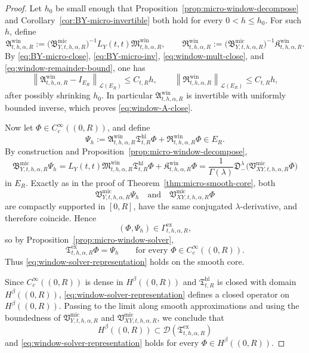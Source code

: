 \documentclass[11pt,a4paper]{amsart}
\theoremstyle{plain}
\theoremstyle{definition}
\theoremstyle{remark}
\begin{document}
\begin{proof}
Let \(h_0\) be small enough that Proposition~\ref{prop:micro-window-decompose} and
Corollary~\ref{cor:BY-micro-invertible} both hold for every \(0<h\le h_0\). For such \(h\), define
\[
\mathfrak A_{t,h,\alpha,R}^{\mathrm{win}}
:=
\bigl(
\mathfrak B_{Y,t,h,\alpha,R}^{\mathrm{mic}}
\bigr)^{-1}
L_Y(t,t)\mathfrak M_{t,h,\alpha,R}^{\mathrm{win}},
\qquad
\mathfrak R_{t,h,\alpha,R}^{\mathrm{win}}
:=
\bigl(
\mathfrak B_{Y,t,h,\alpha,R}^{\mathrm{mic}}
\bigr)^{-1}
\mathfrak K_{t,h,\alpha,R}^{\mathrm{win}}.
\]
By \eqref{eq:BY-micro-close}, \eqref{eq:BY-micro-inv}, \eqref{eq:window-mult-close}, and
\eqref{eq:window-remainder-bound}, one has
\[
\left\|
\mathfrak A_{t,h,\alpha,R}^{\mathrm{win}}-I_{E_R}
\right\|_{\mathcal L(E_R)}
\le
C_{t,R}h,
\qquad
\left\|
\mathfrak R_{t,h,\alpha,R}^{\mathrm{win}}
\right\|_{\mathcal L(E_R)}
\le
C_{t,R}h,
\]
after possibly shrinking \(h_0\). In particular \(\mathfrak A_{t,h,\alpha,R}^{\mathrm{win}}\) is
invertible with uniformly bounded inverse, which proves \eqref{eq:window-A-close}.

Now let \(\Phi\in C_c^\infty((0,R))\), and define
\[
\Psi_h
:=
\mathfrak A_{t,h,\alpha,R}^{\mathrm{win}}
\mathfrak T_{t,R}^{\mathrm{hl}}\Phi
+
\mathfrak R_{t,h,\alpha,R}^{\mathrm{win}}\Phi
\in E_R.
\]
By construction and Proposition~\ref{prop:micro-window-decompose},
\[
\mathfrak B_{Y,t,h,\alpha,R}^{\mathrm{mic}}\Psi_h
=
L_Y(t,t)\mathfrak M_{t,h,\alpha,R}^{\mathrm{win}}
\mathfrak T_{t,R}^{\mathrm{hl}}\Phi
+
\mathfrak K_{t,h,\alpha,R}^{\mathrm{win}}\Phi
=
\frac{1}{\Gamma(\lambda)}
\mathfrak D_-^\lambda
\bigl(
\mathfrak V_{XY,t,h,\alpha,R}^{\mathrm{mic}}\Phi
\bigr)
\]
in \(E_R\). Exactly as in the proof of Theorem~\ref{thm:micro-smooth-core}, both
\[
\mathfrak V_{Y,t,h,\alpha,R}^{\mathrm{mic}}\Psi_h
\quad\text{and}\quad
\mathfrak V_{XY,t,h,\alpha,R}^{\mathrm{mic}}\Phi
\]
are compactly supported in \([0,R]\), have the same conjugated \(\lambda\)-derivative, and
therefore coincide. Hence
\[
(\Phi,\Psi_h)\in \Gamma_{t,h,\alpha,R}^{\mathrm{ex}},
\]
so by Proposition~\ref{prop:micro-window-solver},
\[
\mathfrak T_{t,h,\alpha,R}^{\mathrm{ex}}\Phi=\Psi_h
\qquad\text{for every }\Phi\in C_c^\infty((0,R)).
\]
Thus \eqref{eq:window-solver-representation} holds on the smooth core.

Since \(C_c^\infty((0,R))\) is dense in \(H^\beta((0,R))\) and
\(\mathfrak T_{t,R}^{\mathrm{hl}}\) is closed with domain \(H^\beta((0,R))\),
\eqref{eq:window-solver-representation} defines a closed operator on \(H^\beta((0,R))\). Passing
to the limit along smooth approximations and using the boundedness of
\(\mathfrak V_{Y,t,h,\alpha,R}^{\mathrm{mic}}\) and \(\mathfrak V_{XY,t,h,\alpha,R}^{\mathrm{mic}}\),
we conclude that
\[
H^\beta((0,R))
\subset
\mathcal D(\mathfrak T_{t,h,\alpha,R}^{\mathrm{ex}})
\]
and \eqref{eq:window-solver-representation} holds for every \(\Phi\in H^\beta((0,R))\).


\end{proof}
\end{document}
